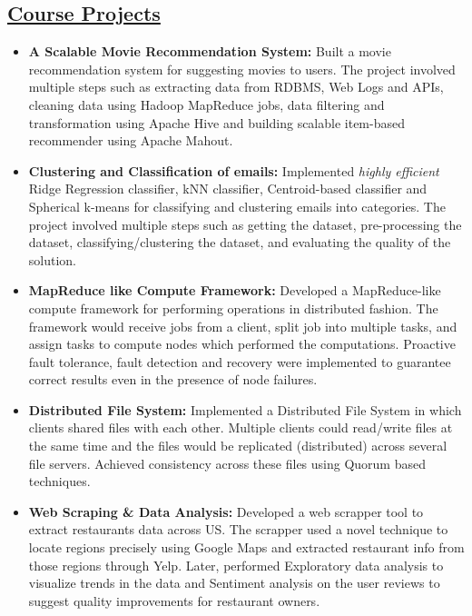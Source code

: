 \documentclass[10pt]{article}
\begin{document}
\subsection*{\underline{Course Projects}}
\vspace{-0.1cm}
\begin{itemize}[leftmargin=0.15in]
\setlength{\itemsep}{0pt}%
\item {\bfseries A Scalable Movie Recommendation System:} Built a movie recommendation system for suggesting movies to users. The project involved multiple steps such as extracting data from RDBMS, Web Logs and APIs, cleaning data using Hadoop MapReduce jobs, data filtering and transformation using Apache Hive and building scalable item-based recommender using Apache Mahout.

\item {\bfseries Clustering and Classification of emails:} Implemented \textit{highly efficient} Ridge Regression classifier, kNN classifier, Centroid-based classifier and Spherical k-means for classifying and clustering emails into categories. The project involved multiple steps such as getting the dataset, pre-processing the dataset, classifying/clustering the dataset, and evaluating the quality of the solution.

\item {\bfseries MapReduce like Compute Framework:} Developed a MapReduce-like compute framework for performing operations in distributed fashion. The framework would receive jobs from a client, split job into multiple tasks, and assign tasks to compute nodes which performed the computations. Proactive fault tolerance, fault detection and recovery were implemented to guarantee correct results even in the presence of node failures.

\item {\bfseries Distributed File System:} Implemented a Distributed File System in which clients shared files with each other. Multiple clients could read/write files at the same time and the files would be replicated (distributed) across several file servers. Achieved consistency across these files using Quorum based techniques.

\item {\bfseries Web Scraping \& Data Analysis:} Developed a web scrapper tool to extract restaurants data across US. The scrapper used a novel technique to locate regions precisely using Google Maps and extracted restaurant info from those regions through Yelp. Later, performed Exploratory data analysis to visualize trends in the data and Sentiment analysis on the user reviews to suggest quality improvements for restaurant owners.

\end{itemize}
\end{document}
